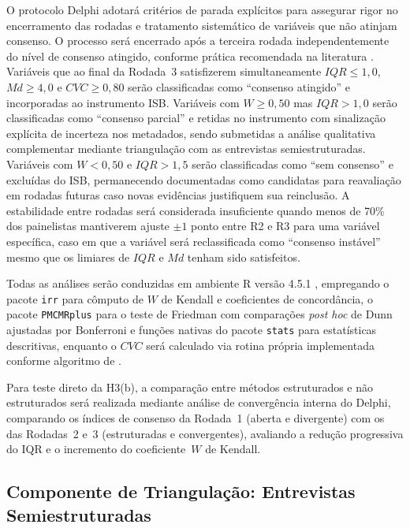 O protocolo Delphi adotará critérios de parada explícitos para assegurar rigor no encerramento das rodadas e tratamento sistemático de variáveis que não atinjam consenso. O processo será encerrado após a terceira rodada independentemente do nível de consenso atingido, conforme prática recomendada na literatura \cite{Diamond2014}. Variáveis que ao final da Rodada~3 satisfizerem simultaneamente $IQR \leq 1{,}0$, $Md \geq 4{,}0$ e $CVC \geq 0{,}80$ serão classificadas como ``consenso atingido'' e incorporadas ao instrumento ISB. Variáveis com $W \geq 0{,}50$ mas $IQR > 1{,}0$ serão classificadas como ``consenso parcial'' e retidas no instrumento com sinalização explícita de incerteza nos metadados, sendo submetidas a análise qualitativa complementar mediante triangulação com as entrevistas semiestruturadas. Variáveis com $W < 0{,}50$ e $IQR > 1{,}5$ serão classificadas como ``sem consenso'' e excluídas do ISB, permanecendo documentadas como candidatas para reavaliação em rodadas futuras caso novas evidências justifiquem sua reinclusão. A estabilidade entre rodadas será considerada insuficiente quando menos de 70\% dos painelistas mantiverem ajuste $\pm 1$ ponto entre R2 e R3 para uma variável específica, caso em que a variável será reclassificada como ``consenso instável'' mesmo que os limiares de $IQR$ e $Md$ tenham sido satisfeitos.

Todas as análises serão conduzidas em ambiente R versão 4.5.1 \cite{RCore2024}, empregando o pacote \texttt{irr} para cômputo de $W$ de Kendall e coeficientes de concordância, o pacote \texttt{PMCMRplus} para o teste de Friedman com comparações \textit{post hoc} de Dunn ajustadas por Bonferroni e funções nativas do pacote \texttt{stats} para estatísticas descritivas, enquanto o $CVC$ será calculado via rotina própria implementada conforme algoritmo de .

Para teste direto da H3(b), a comparação entre métodos estruturados e não estruturados será realizada mediante análise de convergência interna do Delphi, comparando os índices de consenso da Rodada~1 (aberta e divergente) com os das Rodadas~2 e~3 (estruturadas e convergentes), avaliando a redução progressiva do IQR e o incremento do coeficiente~$W$ de Kendall.

\subsection{Componente de Triangulação: Entrevistas Semiestruturadas}

